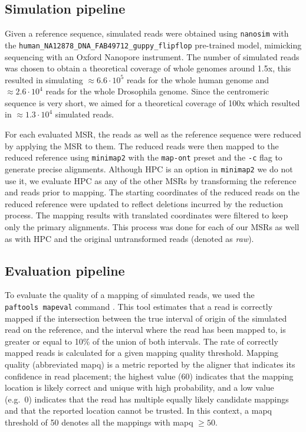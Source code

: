 \documentclass[
  11,
]{scrbook}
\begin{document}
\hypertarget{simulation-pipeline}{%
\subsection{Simulation pipeline}\label{simulation-pipeline}}

Given a reference sequence, simulated reads were obtained using
\texttt{nanosim} \autocite{yangNanoSimNanoporeSequence2017} with the
\texttt{human\_NA12878\_DNA\_FAB49712\_guppy\_flipflop} pre-trained model, mimicking
sequencing with an Oxford Nanopore instrument. The number of simulated
reads was chosen to obtain a theoretical coverage of whole genomes
around 1.5x, this resulted in simulating \(\approx 6.6\cdot10^5\) reads
for the whole human genome and \(\approx 2.6\cdot10^4\) reads for the
whole Drosophila genome. Since the centromeric sequence is very short,
we aimed for a theoretical coverage of 100x which resulted in
\(\approx 1.3\cdot10^4\) simulated reads.

For each evaluated MSR, the reads as well as the reference sequence were
reduced by applying the MSR to them. The reduced reads were then mapped
to the reduced reference using
\texttt{minimap2}\autocite{liMinimap2PairwiseAlignment2018} with the \texttt{map-ont} preset
and the \texttt{-c} flag to generate precise alignments. Although HPC is an
option in \texttt{minimap2} we do not use it, we evaluate HPC as any of the
other MSRs by transforming the reference and reads prior to mapping. The
starting coordinates of the reduced reads on the reduced reference were
updated to reflect deletions incurred by the reduction process. The
mapping results with translated coordinates were filtered to keep only
the primary alignments. This process was done for each of our MSRs as
well as with HPC and the original untransformed reads (denoted as
\emph{raw}).

\hypertarget{sec:evalpipeline}{%
\subsection{Evaluation pipeline}\label{sec:evalpipeline}}

To evaluate the quality of a mapping of simulated reads, we used the
\texttt{paftools\ mapeval} command \autocite{liMinimap2PairwiseAlignment2018}. This tool
estimates that a read is correctly mapped if the intersection between
the true interval of origin of the simulated read on the reference, and
the interval where the read has been mapped to, is greater or equal to
10\% of the union of both intervals. The rate of correctly mapped reads
is calculated for a given mapping quality threshold. Mapping quality
(abbreviated mapq) is a metric reported by the aligner that indicates
its confidence in read placement; the highest value (60) indicates that
the mapping location is likely correct and unique with high probability,
and a low value (e.g.~0) indicates that the read has multiple equally
likely candidate mappings and that the reported location cannot be
trusted. In this context, a mapq threshold of 50 denotes all the
mappings with mapq \(\geq 50\).
\end{document}
